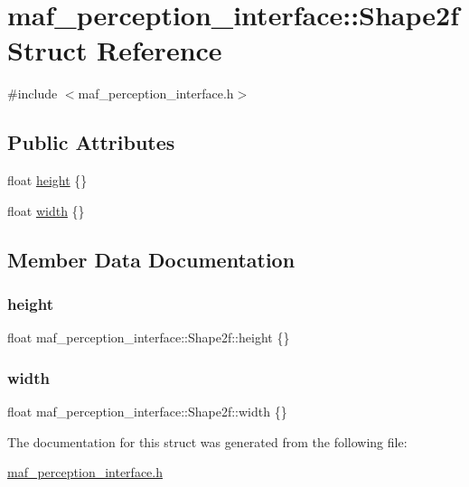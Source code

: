 \hypertarget{structmaf__perception__interface_1_1Shape2f}{}\section{maf\+\_\+perception\+\_\+interface\+:\+:Shape2f Struct Reference}
\label{structmaf__perception__interface_1_1Shape2f}


{\ttfamily \#include $<$maf\+\_\+perception\+\_\+interface.\+h$>$}

\subsection*{Public Attributes}
\begin{DoxyCompactItemize}
\item 
float \hyperlink{structmaf__perception__interface_1_1Shape2f_a49176fac8386cdec680106d3c53a0dd6}{height} \{\}
\item 
float \hyperlink{structmaf__perception__interface_1_1Shape2f_a7f73c331cd424e338c683514c7558ea3}{width} \{\}
\end{DoxyCompactItemize}


\subsection{Member Data Documentation}
\mbox{\label{structmaf__perception__interface_1_1Shape2f_a49176fac8386cdec680106d3c53a0dd6}} 
\subsubsection{\texorpdfstring{height}{height}}
{\footnotesize\ttfamily float maf\+\_\+perception\+\_\+interface\+::\+Shape2f\+::height \{\}}

\mbox{\label{structmaf__perception__interface_1_1Shape2f_a7f73c331cd424e338c683514c7558ea3}} 
\subsubsection{\texorpdfstring{width}{width}}
{\footnotesize\ttfamily float maf\+\_\+perception\+\_\+interface\+::\+Shape2f\+::width \{\}}



The documentation for this struct was generated from the following file\+:\begin{DoxyCompactItemize}
\item 
\hyperlink{maf__perception__interface_8h}{maf\+\_\+perception\+\_\+interface.\+h}\end{DoxyCompactItemize}
